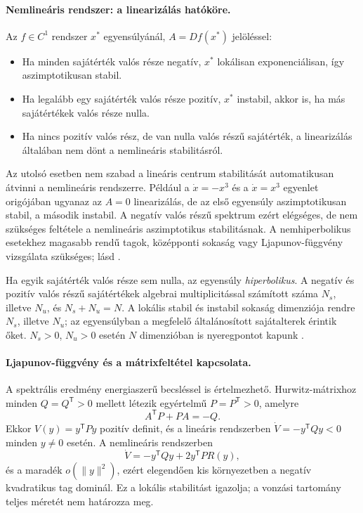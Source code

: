 \paragraph*{Nemlineáris rendszer: a linearizálás hatóköre.}
Az $f\in C^1$ rendszer $x^*$ egyensúlyánál, $A=Df(x^*)$ jelöléssel:
\begin{itemize}
\item Ha minden sajátérték valós része negatív, $x^*$ lokálisan exponenciálisan, így aszimptotikusan stabil.
\item Ha legalább egy sajátérték valós része pozitív, $x^*$ instabil, akkor is, ha más sajátértékek valós része nulla.
\item Ha nincs pozitív valós rész, de van nulla valós részű sajátérték, a linearizálás általában nem dönt a nemlineáris stabilitásról.
\end{itemize}
Az utolsó esetben nem szabad a lineáris centrum stabilitását automatikusan átvinni a nemlineáris rendszerre. Például a $\dot x=-x^3$ és a $\dot x=x^3$ egyenlet origójában ugyanaz az $A=0$ linearizálás, de az első egyensúly aszimptotikusan stabil, a második instabil. A negatív valós részű spektrum ezért elégséges, de nem szükséges feltétele a nemlineáris aszimptotikus stabilitásnak. A nemhiperbolikus esetekhez magasabb rendű tagok, középponti sokaság vagy Ljapunov-függvény vizsgálata szükséges; lásd \cite[5.1--5.2. szakasz]{kuznetsov_book}.

Ha egyik sajátérték valós része sem nulla, az egyensúly \emph{hiperbolikus}. A negatív és pozitív valós részű sajátértékek algebrai multiplicitással számított száma $N_s$, illetve $N_u$, és $N_s+N_u=N$. A lokális stabil és instabil sokaság dimenziója rendre $N_s$, illetve $N_u$; az egyensúlyban a megfelelő általánosított sajátalterek érintik őket. $N_s>0$, $N_u>0$ esetén $N$ dimenzióban is nyeregpontot kapunk \cite[2.2.1. szakasz, 2.1. tétel]{kuznetsov_book}.

\paragraph*{Ljapunov-függvény és a mátrixfeltétel kapcsolata.}
A spektrális eredmény energiaszerű becsléssel is értelmezhető. Hurwitz-mátrixhoz minden $Q=Q^\mathsf T>0$ mellett létezik egyértelmű $P=P^\mathsf T>0$, amelyre
\begin{equation}\label{eq:lyapunov_matrix}
A^\mathsf TP+PA=-Q.
\end{equation}
Ekkor $V(y)=y^\mathsf TPy$ pozitív definit, és a lineáris rendszerben $\dot V=-y^\mathsf TQy<0$ minden $y\neq0$ esetén. A nemlineáris rendszerben
\[
\dot V=-y^\mathsf TQy+2y^\mathsf TPR(y),
\]
és a maradék $o(\|y\|^2)$, ezért elegendően kis környezetben a negatív kvadratikus tag dominál. Ez a lokális stabilitást igazolja; a vonzási tartomány teljes méretét nem határozza meg.

